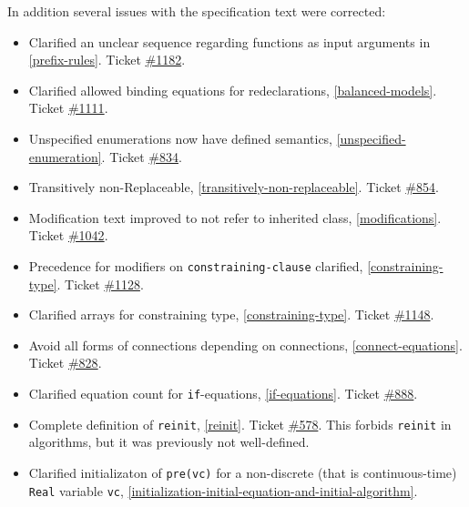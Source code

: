 In addition several issues with the specification text were corrected:
\begin{itemize}
\item
  Clarified an unclear sequence regarding functions as input arguments
  in \cref{prefix-rules}. Ticket
  \href{https://github.com/modelica/ModelicaSpecification/issues/1182}{\#1182}.
\item
  Clarified allowed binding equations for redeclarations, \cref{balanced-models}.
  Ticket \href{https://github.com/modelica/ModelicaSpecification/issues/1111}{\#1111}.
\item
  Unspecified enumerations now have defined semantics, \cref{unspecified-enumeration}.
  Ticket \href{https://github.com/modelica/ModelicaSpecification/issues/834}{\#834}.
\item
  Transitively non-Replaceable, \cref{transitively-non-replaceable}. Ticket
  \href{https://github.com/modelica/ModelicaSpecification/issues/854}{\#854}.
\item
  Modification text improved to not refer to inherited class,
  \cref{modifications}. Ticket
  \href{https://github.com/modelica/ModelicaSpecification/issues/1042}{\#1042}.
\item
  Precedence for modifiers on \lstinline[language=grammar]!constraining-clause! clarified, \cref{constraining-type}.
  Ticket \href{https://github.com/modelica/ModelicaSpecification/issues/1128}{\#1128}.
\item
  Clarified arrays for constraining type, \cref{constraining-type}. Ticket
  \href{https://github.com/modelica/ModelicaSpecification/issues/1148}{\#1148}.
\item
  Avoid all forms of connections depending on connections,
  \cref{connect-equations}. Ticket
  \href{https://github.com/modelica/ModelicaSpecification/issues/828}{\#828}.
\item
  Clarified equation count for \lstinline!if!-equations, \cref{if-equations}.
  Ticket \href{https://github.com/modelica/ModelicaSpecification/issues/888}{\#888}.
\item
  Complete definition of \lstinline!reinit!, \cref{reinit}.
  Ticket \href{https://github.com/modelica/ModelicaSpecification/issues/578}{\#578}.
  This forbids \lstinline!reinit! in algorithms, but it was previously not well-defined.
\item
  Clarified initializaton of \lstinline!pre(vc)! for a non-discrete (that is continuous-time) \lstinline!Real! variable \lstinline!vc!, \cref{initialization-initial-equation-and-initial-algorithm}.

\end{itemize}
